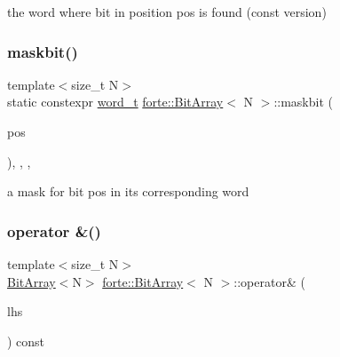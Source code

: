 the word where bit in position pos is found (const version) 

\mbox{\label{classforte_1_1_bit_array_aed63ad4064fdbd25e8d3878767a25e54}} 
\subsubsection{\texorpdfstring{maskbit()}{maskbit()}}
{\footnotesize\ttfamily template$<$size\+\_\+t N$>$ \\
static constexpr \mbox{\hyperlink{classforte_1_1_bit_array_a7f3b4ebbbe4bc80ce60cc6614cb565da}{word\+\_\+t}} \mbox{\hyperlink{classforte_1_1_bit_array}{forte\+::\+Bit\+Array}}$<$ N $>$\+::maskbit (\begin{DoxyParamCaption}\item[{size\+\_\+t}]{pos }\end{DoxyParamCaption})\hspace{0.3cm}{\ttfamily [inline]}, {\ttfamily [static]}, {\ttfamily [protected]}, {\ttfamily [noexcept]}}



a mask for bit pos in its corresponding word 

\mbox{\label{classforte_1_1_bit_array_ae3a8e53963f77e90db15dd25f3abe87a}} 
\subsubsection{\texorpdfstring{operator \&()}{operator \&()}}
{\footnotesize\ttfamily template$<$size\+\_\+t N$>$ \\
\mbox{\hyperlink{classforte_1_1_bit_array}{Bit\+Array}}$<$N$>$ \mbox{\hyperlink{classforte_1_1_bit_array}{forte\+::\+Bit\+Array}}$<$ N $>$\+::operator\& (\begin{DoxyParamCaption}\item[{const \mbox{\hyperlink{classforte_1_1_bit_array}{Bit\+Array}}$<$ N $>$ \&}]{lhs }\end{DoxyParamCaption}) const\hspace{0.3cm}{\ttfamily [inline]}}



